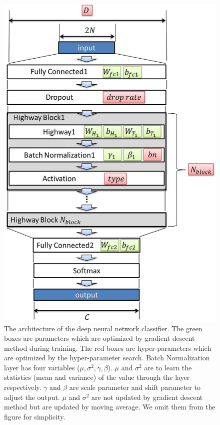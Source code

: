 \documentclass[useamsfonts]{pasj01}
\begin{document}
\begin{figure}[htbp]
  \begin{center}
     \includegraphics[width=\columnwidth]{figures/model_all.eps}
  \end{center}
  \caption{\label{dnnmodel}
  The architecture of the deep neural network classifier. 
  The green boxes are parameters which are optimized by gradient descent method during training. The red boxes are hyper-parameters which are optimized by the hyper-parameter search. 
  Batch Normalization layer has four variables ($\mu, \sigma^2, \gamma, \beta$). $\mu$ and $\sigma^2$ are to learn the statistics (mean and variance) of the value through the layer respectively.  $\gamma$ and $\beta$ are scale parameter and shift parameter to adjust the output. $\mu$ and $\sigma^2$ are not updated by gradient descent method but are updated by moving average. We omit them from the figure for simplicity.
  }%
  \label{fig:dnn_model}
\end{figure}
%
\end{document}
